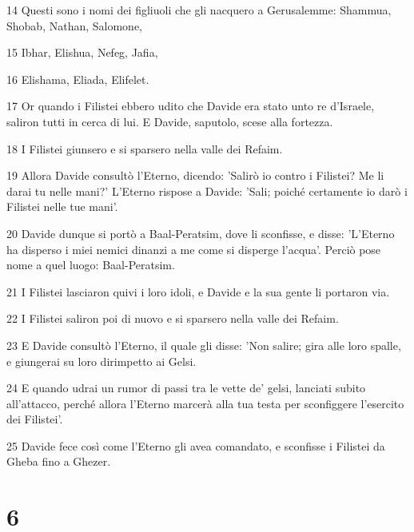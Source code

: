 \par 14 Questi sono i nomi dei figliuoli che gli nacquero a Gerusalemme: Shammua, Shobab, Nathan, Salomone,
\par 15 Ibhar, Elishua, Nefeg, Jafia,
\par 16 Elishama, Eliada, Elifelet.
\par 17 Or quando i Filistei ebbero udito che Davide era stato unto re d'Israele, saliron tutti in cerca di lui. E Davide, saputolo, scese alla fortezza.
\par 18 I Filistei giunsero e si sparsero nella valle dei Refaim.
\par 19 Allora Davide consultò l'Eterno, dicendo: 'Salirò io contro i Filistei? Me li darai tu nelle mani?' L'Eterno rispose a Davide: 'Sali; poiché certamente io darò i Filistei nelle tue mani'.
\par 20 Davide dunque si portò a Baal-Peratsim, dove li sconfisse, e disse: 'L'Eterno ha disperso i miei nemici dinanzi a me come si disperge l'acqua'. Perciò pose nome a quel luogo: Baal-Peratsim.
\par 21 I Filistei lasciaron quivi i loro idoli, e Davide e la sua gente li portaron via.
\par 22 I Filistei saliron poi di nuovo e si sparsero nella valle dei Refaim.
\par 23 E Davide consultò l'Eterno, il quale gli disse: 'Non salire; gira alle loro spalle, e giungerai su loro dirimpetto ai Gelsi.
\par 24 E quando udrai un rumor di passi tra le vette de' gelsi, lanciati subito all'attacco, perché allora l'Eterno marcerà alla tua testa per sconfiggere l'esercito dei Filistei'.
\par 25 Davide fece così come l'Eterno gli avea comandato, e sconfisse i Filistei da Gheba fino a Ghezer.

\chapter{6}

